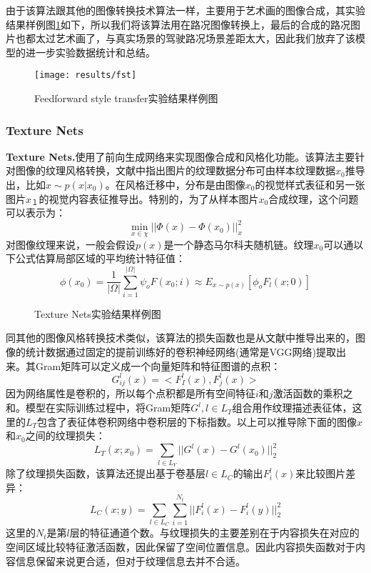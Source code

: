 由于该算法跟其他的图像转换技术算法一样，主要用于艺术画的图像合成，其实验结果样例图\ref{fig:fst}如下，所以我们将该算法用在路况图像转换上，最后的合成的路况图片也都太过艺术画了，与真实场景的驾驶路况场景差距太大，因此我们放弃了该模型的进一步实验数据统计和总结。 

\begin{figure}[h]
    \centering
    \texttt{[image: results/fst]}
    \caption{Feedforward style transfer实验结果样例图}
    \label{fig:fst}
\end{figure}


\subsubsection{Texture Nets}

\textbf{Texture Nets.}\cite{texture-nets}\quad 使用了前向生成网络来实现图像合成和风格化功能。该算法主要针对图像的纹理风格转换，文献\cite{texture-nets}中指出图片的纹理数据分布可由样本纹理数据$x_0$推导出，比如$x\sim p(x|x_0)$。在风格迁移中，分布是由图像$x_0$的视觉样式表征和另一张图片$x_１$的视觉内容表征推导出。特别的，为了从样本图片$x_0$合成纹理，这个问题可以表示为：
$$\min_{x\in \chi}||\Phi(x)-\Phi(x_0)||_x^2$$
对图像纹理来说，一般会假设$p(x)$是一个静态马尔科夫随机链。纹理$x_0$可以通以下公式估算局部区域的平均统计特征值：
$$\phi(x_0)=\frac{1}{|\Omega|}\sum_{i=1}^{|\Omega|}\psi_oF(x_0;i)\approx E_{x\sim p(x)}[\phi_oF_l(x;0)]$$

\begin{figure}[b]
    \centering
    \subfigure[官方实验样例图]{
        \texttt{[image: tn\_o\_1]}
    }
    \caption{Texture Nets实验结果样例图} 
    \label{tn-example}
\end{figure}

同其他的图像风格转换技术类似，该算法的损失函数也是从文献\cite{nst}中推导出来的，图像的统计数据通过固定的提前训练好的卷积神经网络(通常是VGG网络)提取出来。其Gram矩阵可以定义成一个向量矩阵和特征图谱的点积：
$$G_{ij}^l(x)=<F_I^l(x),F_j^l(x)>$$
因为网络属性是卷积的，所以每个点积都是所有空间特征$i$和$j$激活函数的乘积之和。模型在实际训练过程中，将Gram矩阵$G^l,l\in L_T$组合用作纹理描述表征体，这里的$L_T$包含了表征体卷积网络中卷积层的下标指数。以上可以推导除下面的图像$x$和$x_0$之间的纹理损失：
$$L_T(x;x_0)=\sum_{l\in L_Y}||G^l(x)-G^l(x_0)||_2^2$$
除了纹理损失函数，该算法还提出基于卷基层$l\in L_C$的输出$F_i^l(x)$来比较图片差异：
$$L_C(x;y)=\sum_{l\in L_C}\sum_{i=1}^{N_t}||F_i^l(x)-F_i^l(y)||_2^2$$
这里的$N_t$是第$l$层的特征通道个数。与纹理损失的主要差别在于内容损失在对应的空间区域比较特征激活函数，因此保留了空间位置信息。因此内容损失函数对于内容信息保留来说更合适，但对于纹理信息去并不合适。

